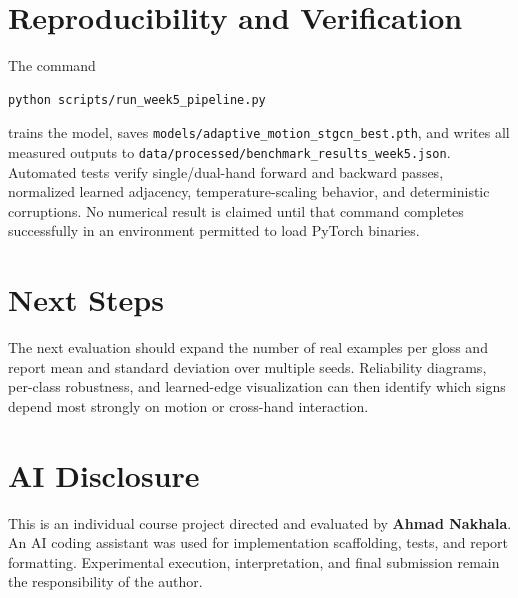 \documentclass{article}
\begin{document}
\section*{Reproducibility and Verification}
The command
\begin{verbatim}
python scripts/run_week5_pipeline.py
\end{verbatim}
trains the model, saves \texttt{models/adaptive\_motion\_stgcn\_best.pth}, and writes all measured outputs to \texttt{data/processed/benchmark\_results\_week5.json}. Automated tests verify single/dual-hand forward and backward passes, normalized learned adjacency, temperature-scaling behavior, and deterministic corruptions. No numerical result is claimed until that command completes successfully in an environment permitted to load PyTorch binaries.

\section*{Next Steps}
The next evaluation should expand the number of real examples per gloss and report mean and standard deviation over multiple seeds. Reliability diagrams, per-class robustness, and learned-edge visualization can then identify which signs depend most strongly on motion or cross-hand interaction.

\section*{AI Disclosure}
This is an individual course project directed and evaluated by \textbf{Ahmad Nakhala}. An AI coding assistant was used for implementation scaffolding, tests, and report formatting. Experimental execution, interpretation, and final submission remain the responsibility of the author.
\end{document}
